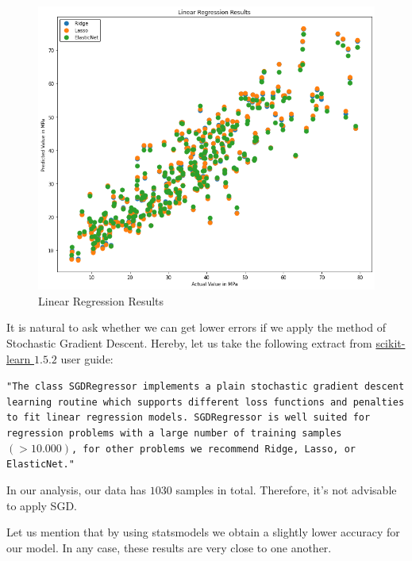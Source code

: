 \documentclass[a4paper,11pt]{amsart}
\begin{document}
\medbreak

\begin{figure}
  \includegraphics[width=\linewidth]{download.png}
  \caption{Linear Regression Results}
  \label{fig:boat1}
\end{figure}

It is natural to ask whether we can get lower errors if we apply the method of Stochastic Gradient Descent. Hereby, let us take the following extract from \href{https://scikit-learn.org/stable/modules/sgd.html}{scikit-learn $1.5.2$} user guide:

\medbreak

\begin{flushleft}
\texttt{"The class SGDRegressor implements a plain stochastic gradient descent learning routine which supports different loss functions and penalties to fit linear regression models. SGDRegressor is well suited for regression problems with a large number of training samples $(> 10.000)$, for other problems we recommend Ridge, Lasso, or ElasticNet."}
\end{flushleft}

\medbreak

In our analysis, our data has $1030$ samples in total. Therefore, it's not advisable to apply SGD.

\medbreak

Let us mention that by using statsmodels we obtain a slightly lower accuracy for our model. In any case, these results are very close to one another.
\end{document}
